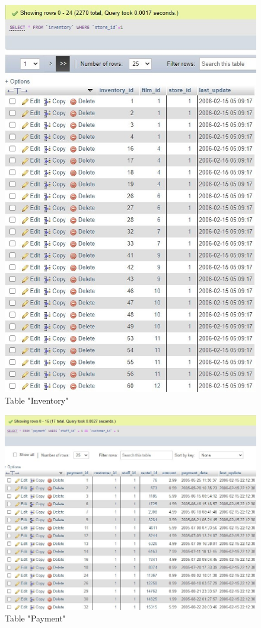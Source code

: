\documentclass[openany]{article}
\begin{document}
		\begin{figure}[H]
			\includegraphics[width=\textwidth]{inventory_selectwhere}
			\caption{Table "Inventory"}
		\end{figure}
		\begin{figure}[H]
			\includegraphics[width=\textwidth]{payment_selectwhere}
			\caption{Table "Payment"}
		\end{figure}
\end{document}
